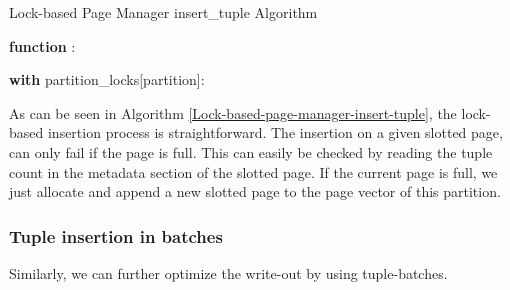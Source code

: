 \begin{algorithm}[h]
  \caption{Lock-based Page Manager insert\_tuple Algorithm}
  \label{Lock-based-page-manager-insert-tuple}



  \textbf{function} :

  \textbf{with} partition\_locks[partition]:
\end{algorithm}
As can be seen in Algorithm \ref{Lock-based-page-manager-insert-tuple}, the lock-based insertion process is straightforward.
The insertion on a given slotted page, can only fail if the page is full.
This can easily be checked by reading the tuple count in the metadata section of the slotted page.
If the current page is full, we just allocate and append a new slotted page to the page vector of this partition.

\subsubsection*{Tuple insertion in batches}
Similarly, we can further optimize the write-out by using tuple-batches.



